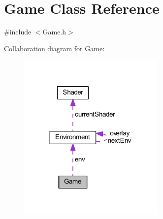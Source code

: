 \hypertarget{class_game}{}\section{Game Class Reference}
\label{class_game}


{\ttfamily \#include $<$Game.\+h$>$}



Collaboration diagram for Game\+:
\nopagebreak
\begin{figure}[H]
\begin{center}
\leavevmode
\includegraphics[width=203pt]{class_game__coll__graph}
\end{center}
\end{figure}
